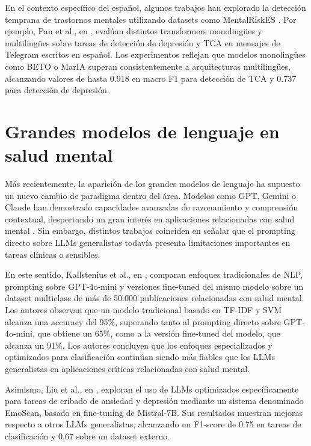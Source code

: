 En el contexto específico del español, algunos trabajos han explorado la detección temprana de trastornos mentales utilizando datasets como MentalRiskES \cite{marmol-romero_overview_2023}. Por ejemplo, Pan et al., en \cite{pan_umuteam_nodate}, evalúan distintos transformers monolingües y multilingües sobre tareas de detección de depresión y \ac{TCA} en mensajes de Telegram escritos en español. Los experimentos reflejan que modelos monolingües como BETO o MarIA superan consistentemente a arquitecturas multilingües, alcanzando valores de hasta 0.918 en macro F1 para detección de \ac{TCA} y 0.737 para detección de depresión.

\section{Grandes modelos de lenguaje en salud mental}

Más recientemente, la aparición de los grandes modelos de lenguaje ha supuesto un nuevo cambio de paradigma dentro del área. Modelos como GPT, Gemini o Claude han demostrado capacidades avanzadas de razonamiento y comprensión contextual, despertando un gran interés en aplicaciones relacionadas con salud mental \cite{ge_survey_2025}. Sin embargo, distintos trabajos coinciden en señalar que el prompting directo sobre LLMs generalistas todavía presenta limitaciones importantes en tareas clínicas o sensibles.

En este sentido, Kallstenius et al., en \cite{kallstenius_comparing_2025}, comparan enfoques tradicionales de NLP, prompting sobre GPT-4o-mini y versiones fine-tuned del mismo modelo sobre un dataset multiclase de más de 50.000 publicaciones relacionadas con salud mental. Los autores observan que un modelo tradicional basado en TF-IDF y SVM alcanza una accuracy del 95\%, superando tanto al prompting directo sobre GPT-4o-mini, que obtiene un 65\%, como a la versión fine-tuned del modelo, que alcanza un 91\%. Los autores concluyen que los enfoques especializados y optimizados para clasificación continúan siendo más fiables que los LLMs generalistas en aplicaciones críticas relacionadas con salud mental.

Asimismo, Liu et al., en \cite{liu_enhanced_2025}, exploran el uso de LLMs optimizados específicamente para tareas de cribado de ansiedad y depresión mediante un sistema denominado EmoScan, basado en fine-tuning de Mistral-7B. Sus resultados muestran mejoras respecto a otros LLMs generalistas, alcanzando un F1-score de 0.75 en tareas de clasificación y 0.67 sobre un dataset externo.


